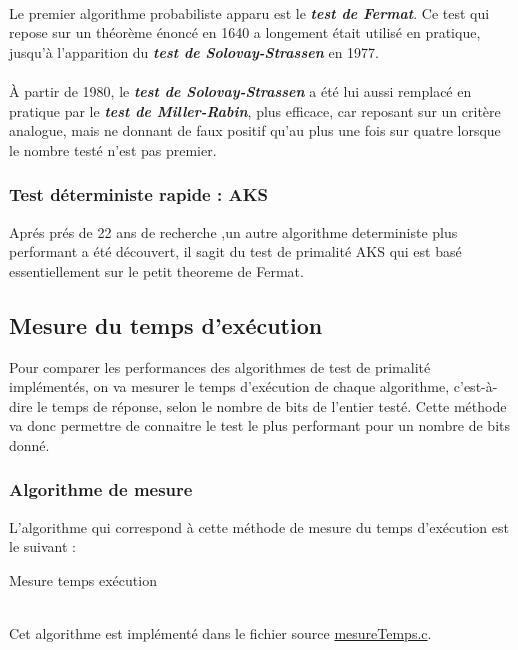 			\paragraph{}Le premier algorithme probabiliste apparu est le \textit{\textbf{test de Fermat}}. Ce test qui repose sur un théorème énoncé en 1640 a longement était utilisé en pratique, jusqu'à l'apparition du \textit{\textbf{test de Solovay-Strassen}} en 1977. 
			
			\paragraph{} À partir de 1980, le \textit{\textbf{test de Solovay-Strassen}} a été lui aussi remplacé en pratique par le \textit{\textbf{test de Miller-Rabin}}, plus efficace, car reposant sur un critère analogue, mais ne donnant de faux positif qu'au plus une fois sur quatre lorsque le nombre testé n'est pas premier.
			
		\subsubsection*{Test déterministe rapide : AKS}
			Aprés prés de 22 ans de recherche ,un autre algorithme deterministe 
			plus performant a été découvert, il sagit du test de primalité AKS qui 
			est basé essentiellement sur le petit theoreme de Fermat.
	
	\subsection{Mesure du temps d'exécution}
		Pour comparer les performances des algorithmes de test de primalité implémentés, on va mesurer le temps d'exécution de chaque algorithme, c'est-à-dire le temps de réponse, selon le nombre de bits de l'entier testé. Cette méthode va donc permettre de connaitre le test le plus performant pour un nombre de bits donné.
		
		\subsubsection*{Algorithme de mesure}
			L'algorithme qui correspond à cette méthode de mesure du temps d'exécution est le suivant :\\
			
			\begin{algorithm}[H]
				\caption{Mesure temps exécution}\label{MEST}
			\end{algorithm}
			~\\
			Cet algorithme est implémenté dans le fichier source \href{run:../../App/src/mesures_performance/mesureTemps.c}{mesureTemps.c}.
			
